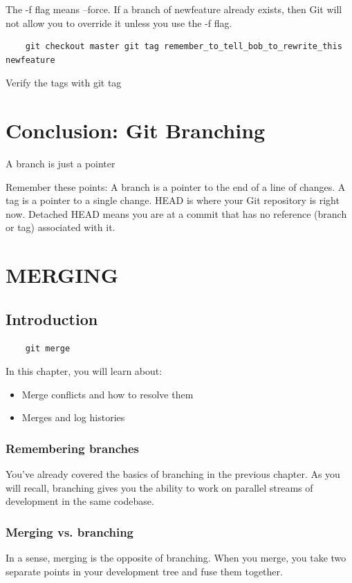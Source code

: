 \documentclass{report}
\begin{document}
The -f flag means --force. If a branch of newfeature already exists, then Git will not allow you to override it unless you use the -f flag. 

\begin{lstlisting} 
    git checkout master git tag remember_to_tell_bob_to_rewrite_this newfeature 
\end{lstlisting} 

Verify the tags with git tag 

\chapter{Conclusion: Git Branching} A branch is just a pointer 

Remember these points: A branch is a pointer to the end of a line of changes. A tag is a pointer to a single change. HEAD is where your Git repository is right now. Detached HEAD means you are at a commit that has no reference (branch or tag) associated with it.

\chapter{MERGING}

\section{Introduction}

\begin{lstlisting}
    git merge
\end{lstlisting}

In this chapter, you will learn about:
\begin{itemize}
    \item Merge conflicts and how to resolve them
    \item Merges and log histories
\end{itemize}

\subsection{Remembering branches}
You've already covered the basics of branching in the previous chapter. As you will recall, branching gives you the ability to work on parallel streams of development in the same codebase.

\subsection{Merging vs. branching}
In a sense, merging is the opposite of branching. When you merge, you take two separate points in your development tree and fuse them together.
\end{document}
